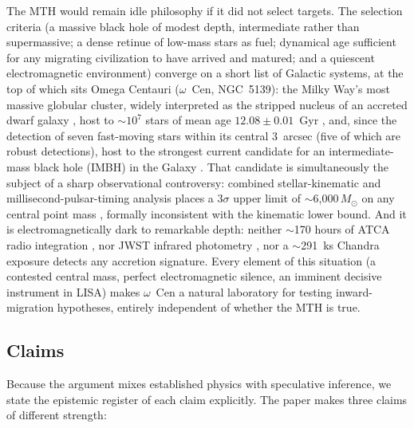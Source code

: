 \documentclass[11pt]{article}
\newcommand{\msun}{\ensuremath{M_\odot}}
\begin{document}
The MTH would remain idle philosophy if it did not select targets. The selection criteria (a massive black hole of modest depth, intermediate rather than supermassive; a dense retinue of low-mass stars as fuel; dynamical age sufficient for any migrating civilization to have arrived and matured; and a quiescent electromagnetic environment) converge on a short list of Galactic systems, at the top of which sits Omega Centauri ($\omega$~Cen, NGC~5139): the Milky Way's most massive globular cluster, widely interpreted as the stripped nucleus of an accreted dwarf galaxy \citep{HilkerRichtler2000,BekkiTsujimoto2019,Ibata2019}, host to $\sim 10^{7}$ stars of mean age $12.08 \pm 0.01$~Gyr \citep{Clontz2024}, and, since the detection of seven fast-moving stars within its central 3~arcsec (five of which are robust detections), host to the strongest current candidate for an intermediate-mass black hole (IMBH) in the Galaxy \citep{Haberle2024Nature}. That candidate is simultaneously the subject of a sharp observational controversy: combined stellar-kinematic and millisecond-pulsar-timing analysis places a $3\sigma$ upper limit of $\sim$6,000\,\msun{} on any central point mass \citep{BanaresHernandez2025}, formally inconsistent with the kinematic lower bound. And it is electromagnetically dark to remarkable depth: neither $\sim$170 hours of ATCA radio integration \citep{Mahida2026}, nor JWST infrared photometry \citep{Chen2025JWST}, nor a $\sim$291~ks Chandra exposure \citep{Haggard2013} detects any accretion signature. Every element of this situation (a contested central mass, perfect electromagnetic silence, an imminent decisive instrument in LISA) makes $\omega$~Cen a natural laboratory for testing inward-migration hypotheses, entirely independent of whether the MTH is true.

\subsection{Claims}
\label{sec:claims}

Because the argument mixes established physics with speculative inference, we state the epistemic register of each claim explicitly. The paper makes three claims of different strength:
\end{document}
